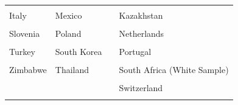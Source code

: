 \documentclass[
]{article}
\begin{document}
\begin{table}[h]
\begin{tabular}[t]{>{}l>{}l>{}l>{}l}
\addlinespace
\textcolor[HTML]{739999}{\cellcolor{gray!6}{Israel}} & \textcolor[HTML]{000026}{\cellcolor{gray!6}{Malaysia}} & \textcolor[HTML]{407326}{\cellcolor{gray!6}{}} & \textcolor[HTML]{BF7300}{\cellcolor{gray!6}{Ireland}}\\
\textcolor[HTML]{739999}{Italy} & \textcolor[HTML]{000026}{Mexico} & \textcolor[HTML]{407326}{} & \textcolor[HTML]{BF7300}{Kazakhstan}\\
\textcolor[HTML]{739999}{\cellcolor{gray!6}{Philippines}} & \textcolor[HTML]{000026}{\cellcolor{gray!6}{Nigeria}} & \textcolor[HTML]{407326}{\cellcolor{gray!6}{}} & \textcolor[HTML]{BF7300}{\cellcolor{gray!6}{Namibia}}\\
\textcolor[HTML]{739999}{Slovenia} & \textcolor[HTML]{000026}{Poland} & \textcolor[HTML]{407326}{} & \textcolor[HTML]{BF7300}{Netherlands}\\
\textcolor[HTML]{739999}{\cellcolor{gray!6}{Spain}} & \textcolor[HTML]{000026}{\cellcolor{gray!6}{Russia}} & \textcolor[HTML]{407326}{\cellcolor{gray!6}{}} & \textcolor[HTML]{BF7300}{\cellcolor{gray!6}{New Zealand}}\\
\addlinespace
\textcolor[HTML]{739999}{Turkey} & \textcolor[HTML]{000026}{South Korea} & \textcolor[HTML]{407326}{} & \textcolor[HTML]{BF7300}{Portugal}\\
\textcolor[HTML]{739999}{\cellcolor{gray!6}{Zambia}} & \textcolor[HTML]{000026}{\cellcolor{gray!6}{Taiwan}} & \textcolor[HTML]{407326}{\cellcolor{gray!6}{}} & \textcolor[HTML]{BF7300}{\cellcolor{gray!6}{Singapore}}\\
\textcolor[HTML]{739999}{Zimbabwe} & \textcolor[HTML]{000026}{Thailand} & \textcolor[HTML]{407326}{} & \textcolor[HTML]{BF7300}{South Africa (White Sample)}\\
\textcolor[HTML]{739999}{\cellcolor{gray!6}{}} & \textcolor[HTML]{000026}{\cellcolor{gray!6}{Venezuela}} & \textcolor[HTML]{407326}{\cellcolor{gray!6}{}} & \textcolor[HTML]{BF7300}{\cellcolor{gray!6}{Sweden}}\\
\textcolor[HTML]{739999}{} & \textcolor[HTML]{000026}{} & \textcolor[HTML]{407326}{} & \textcolor[HTML]{BF7300}{Switzerland}\\
\addlinespace
\textcolor[HTML]{739999}{\cellcolor{gray!6}{}} & \textcolor[HTML]{000026}{\cellcolor{gray!6}{}} & \textcolor[HTML]{407326}{\cellcolor{gray!6}{}} & \textcolor[HTML]{BF7300}{\cellcolor{gray!6}{USA}}\\
\bottomrule
\end{tabular}
\end{table}
\end{document}
